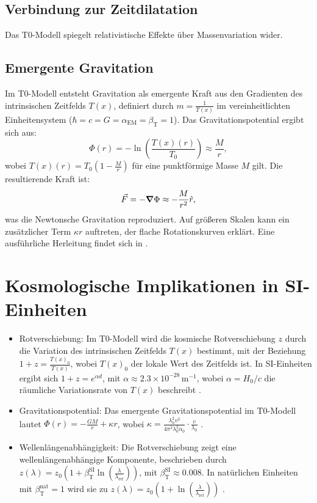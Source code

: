 \documentclass[12pt,a4paper]{article}
\newcommand{\Tfield}{T(x)}
\newcommand{\betaT}{\beta_{\text{T}}}
\newcommand{\alphaEM}{\alpha_{\text{EM}}}
\newcommand{\Tzero}{T_0}
\begin{document}
	\subsection{Verbindung zur Zeitdilatation}
	Das T0-Modell spiegelt relativistische Effekte über Massenvariation wider.
	\subsection{Emergente Gravitation}
	Im T0-Modell entsteht Gravitation als emergente Kraft aus den Gradienten des intrinsischen Zeitfelds \(\Tfield\), definiert durch \( m = \frac{1}{\Tfield} \) im vereinheitlichten Einheitensystem (\(\hbar = c = G = \alphaEM = \betaT = 1\)). Das Gravitationspotential ergibt sich aus:
	\begin{equation}
		\Phi(r) = -\ln\left(\frac{\Tfield(r)}{\Tzero}\right) \approx \frac{M}{r},
	\end{equation}
	wobei \(\Tfield(r) = \Tzero \left(1 - \frac{M}{r}\right)\) für eine punktförmige Masse \(M\) gilt. Die resultierende Kraft ist:
	\begin{equation}
		\vec{F} = -\grad \Phi \approx -\frac{M}{r^2} \hat{r},
	\end{equation}
	was die Newtonsche Gravitation reproduziert. Auf größeren Skalen kann ein zusätzlicher Term \(\kappa r\) auftreten, der flache Rotationskurven erklärt. Eine ausführliche Herleitung findet sich in \cite{pascher_emergente_gravitation_2025, pascher_alphabeta_2025}.
	
	\section{Kosmologische Implikationen in SI-Einheiten}
	\begin{itemize}
		\item Rotverschiebung: Im T0-Modell wird die kosmische Rotverschiebung \(z\) durch die Variation des intrinsischen Zeitfelds \(\Tfield\) bestimmt, mit der Beziehung \(1 + z = \frac{\Tfield_0}{\Tfield}\), wobei \(\Tfield_0\) der lokale Wert des Zeitfelds ist. In SI-Einheiten ergibt sich \(1 + z = e^{\alpha d}\), mit \(\alpha \approx 2.3 \times 10^{-28} \, \text{m}^{-1}\), wobei \(\alpha = H_0/c\) die räumliche Variationsrate von \(\Tfield\) beschreibt \cite{pascher_galaxies_2025, pascher_emergente_gravitation_2025}.
		\item Gravitationspotential: Das emergente Gravitationspotential im T0-Modell lautet \(\Phi(r) = -\frac{GM}{r} + \kappa r\), wobei \(\kappa = \frac{\lambda_h^2 v^2}{4\pi^2 \lambda_0^2 \alpha_0} \cdot \frac{v}{\lambda_0}\) \cite{pascher_emergente_gravitation_2025}.
		\item Wellenlängenabhängigkeit: Die Rotverschiebung zeigt eine wellenlängenabhängige Komponente, beschrieben durch \(z(\lambda) = z_0 \left(1 + \betaT^{\text{SI}} \ln\left(\frac{\lambda}{\lambda_{\text{ref}}}\right)\right)\), mit \(\betaT^{\text{SI}} \approx 0.008\). In natürlichen Einheiten mit \(\betaT^{\text{nat}} = 1\) wird sie zu \(z(\lambda) = z_0 \left(1 + \ln\left(\frac{\lambda}{\lambda_{\text{ref}}}\right)\right)\) \cite{pascher_temp_2025, pascher_alphabeta_2025}.
	\end{itemize}
	
\end{document}
